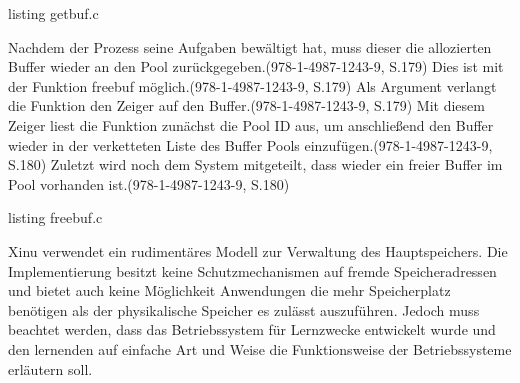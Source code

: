 listing getbuf.c

Nachdem der Prozess seine Aufgaben bewältigt hat, muss dieser die allozierten Buffer wieder an den Pool zurückgegeben.(978-1-4987-1243-9, S.179) Dies ist mit der Funktion freebuf möglich.(978-1-4987-1243-9, S.179) Als Argument verlangt die Funktion den Zeiger auf den Buffer.(978-1-4987-1243-9, S.179) Mit diesem Zeiger liest die Funktion zunächst die Pool ID aus, um anschließend den Buffer wieder in der verketteten Liste des Buffer Pools einzufügen.(978-1-4987-1243-9, S.180) Zuletzt wird noch dem System mitgeteilt, dass wieder ein freier Buffer im Pool vorhanden ist.(978-1-4987-1243-9, S.180)

listing freebuf.c

Xinu verwendet ein rudimentäres Modell zur Verwaltung des Hauptspeichers. Die Implementierung besitzt keine Schutzmechanismen auf fremde Speicheradressen und bietet auch keine Möglichkeit Anwendungen die mehr Speicherplatz benötigen als der physikalische Speicher es zulässt auszuführen. Jedoch muss beachtet werden, dass das Betriebssystem für Lernzwecke entwickelt wurde und den lernenden auf einfache Art und Weise die Funktionsweise der Betriebssysteme erläutern soll.

